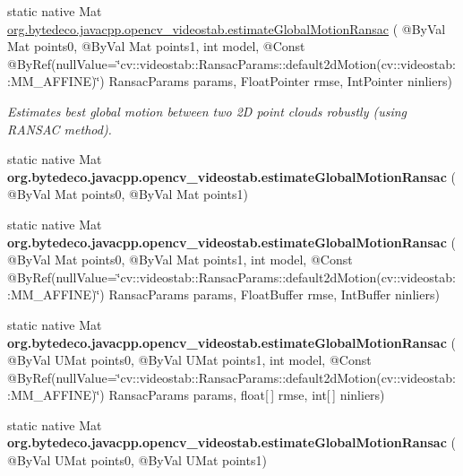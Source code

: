 \begin{DoxyCompactItemize}
static native Mat \hyperlink{group__videostab__motion_gab1399e69e37b80626504e158be509601}{org.\+bytedeco.\+javacpp.\+opencv\+\_\+videostab.\+estimate\+Global\+Motion\+Ransac} ( @By\+Val Mat points0, @By\+Val Mat points1, int model, @Const @By\+Ref(null\+Value=\char`\"{}cv\+::videostab\+::\+Ransac\+Params\+::default2d\+Motion(cv\+::videostab\+::\+M\+M\+\_\+\+A\+F\+F\+I\+NE)\char`\"{}) Ransac\+Params params, Float\+Pointer rmse, Int\+Pointer ninliers)
\begin{DoxyCompactList}\small\item\em Estimates best global motion between two 2D point clouds robustly (using R\+A\+N\+S\+AC method). \end{DoxyCompactList}\item 
\mbox{\label{group__videostab__motion_ga87e80e36f411d9eb34900da8212eeb14}} 
static native Mat {\bfseries org.\+bytedeco.\+javacpp.\+opencv\+\_\+videostab.\+estimate\+Global\+Motion\+Ransac} ( @By\+Val Mat points0, @By\+Val Mat points1)
\item 
\mbox{\label{group__videostab__motion_ga789883006d0814495fbce60b2f095a8b}} 
static native Mat {\bfseries org.\+bytedeco.\+javacpp.\+opencv\+\_\+videostab.\+estimate\+Global\+Motion\+Ransac} ( @By\+Val Mat points0, @By\+Val Mat points1, int model, @Const @By\+Ref(null\+Value=\char`\"{}cv\+::videostab\+::\+Ransac\+Params\+::default2d\+Motion(cv\+::videostab\+::\+M\+M\+\_\+\+A\+F\+F\+I\+NE)\char`\"{}) Ransac\+Params params, Float\+Buffer rmse, Int\+Buffer ninliers)
\item 
\mbox{\label{group__videostab__motion_gaa6e33ba187ad6ec67c48b5ffac69c690}} 
static native Mat {\bfseries org.\+bytedeco.\+javacpp.\+opencv\+\_\+videostab.\+estimate\+Global\+Motion\+Ransac} ( @By\+Val U\+Mat points0, @By\+Val U\+Mat points1, int model, @Const @By\+Ref(null\+Value=\char`\"{}cv\+::videostab\+::\+Ransac\+Params\+::default2d\+Motion(cv\+::videostab\+::\+M\+M\+\_\+\+A\+F\+F\+I\+NE)\char`\"{}) Ransac\+Params params, float\mbox{[}$\,$\mbox{]} rmse, int\mbox{[}$\,$\mbox{]} ninliers)
\item 
\mbox{\label{group__videostab__motion_ga200287fc1250b0564a0ec019da30e135}} 
static native Mat {\bfseries org.\+bytedeco.\+javacpp.\+opencv\+\_\+videostab.\+estimate\+Global\+Motion\+Ransac} ( @By\+Val U\+Mat points0, @By\+Val U\+Mat points1)

\end{DoxyCompactItemize}
